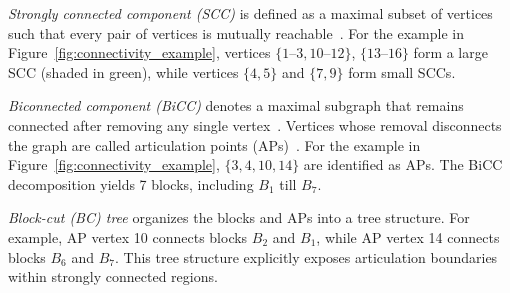 \textit{Strongly connected component (SCC)} 
is defined as a maximal subset of vertices such that every pair of vertices is mutually reachable~\cite{sharir1981strong}.
For the example in Figure~\ref{fig:connectivity_example}, vertices $\{1\text{--}3,10\text{--}12\}$, $\{13\text{--}16\}$ form a large SCC (shaded in green), while vertices $\{4,5\}$ and $\{7,9\}$ form small SCCs.

\textit{Biconnected component (BiCC)}
denotes a maximal subgraph that remains connected after removing any single vertex~\cite{westbrook1992maintaining}.
Vertices whose removal disconnects the graph are called articulation points (APs)~\cite{hopcroft1973algorithm}.
For the example in Figure~\ref{fig:connectivity_example},  $\{3,4,10,14\}$ are identified as APs.
The BiCC decomposition yields 7 blocks, including $B_1$ till $B_7$.

\textit{Block-cut (BC) tree} organizes the 
blocks and APs into a tree structure.
For example, AP vertex 10 connects blocks $B_2$ and $B_1$, while AP vertex 14 connects blocks $B_6$ and $B_7$.
This tree structure explicitly exposes articulation boundaries within strongly connected regions.





